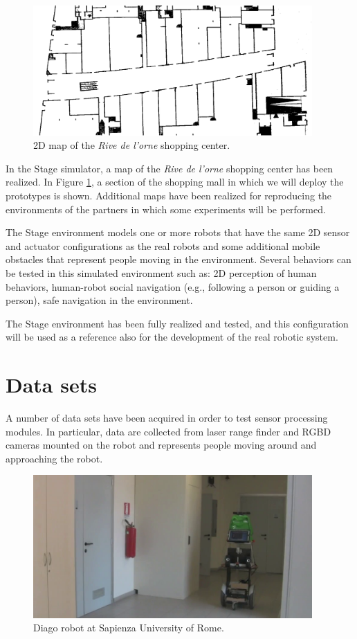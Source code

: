 \documentclass{article}
\begin{document}
\begin{figure}
\includegraphics[width=0.95\textwidth]{Rive1.png}
\caption{2D map of the \emph{Rive de l'orne} shopping center.}
\label{fig:stage}
\end{figure}


In the Stage simulator, a map of the \emph{Rive de l'orne} shopping center has been realized. In Figure \ref{fig:stage}, a section of the shopping mall in which we will deploy the prototypes is shown.
Additional maps have been realized for reproducing the environments of the partners in which some experiments will be performed.

The Stage environment models one or more robots that have the same 2D sensor and actuator configurations as the real robots and some additional mobile obstacles that represent people moving in the environment. Several behaviors can be tested in this simulated environment such as: 2D perception of human behaviors, human-robot social navigation (e.g., following a person or guiding a person), safe navigation in the environment.

The Stage environment has been fully realized and tested, and this configuration will be used as a reference also for the development of the real robotic system.

\section{Data sets}

A number of data sets have been acquired in order to test sensor processing modules. In particular, data are collected from laser range finder and RGBD cameras mounted on the robot and represents people moving around and approaching the robot.

\begin{figure}
\includegraphics[width=0.95\textwidth]{diago.png}
\caption{Diago robot at Sapienza University of Rome.}
\label{fig:diago}
\end{figure}
\end{document}
